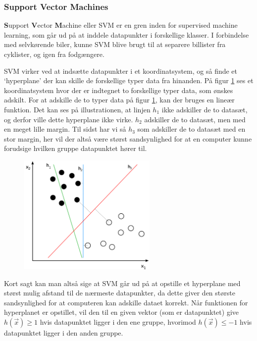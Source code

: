 \subsubsection{Support Vector Machines}
\textbf{S}upport \textbf{V}ector \textbf{M}achine eller SVM er en gren inden for supervised machine learning\cite{ML_BOOK}, som går ud på at inddele datapunkter i forskellige klasser. I forbindelse med selvkørende biler, kunne SVM blive brugt til at separere billister fra cyklister, og igen fra fodgængere.

SVM virker ved at indsætte datapunkter i et koordinatsystem, og så finde et `hyperplane' der kan skille de forskellige typer data fra hinanden. På figur \ref{fig:SVM} ses et koordinatsystem hvor der er indtegnet to forskellige typer data, som ønskes adskilt. For at adskille de to typer data på figur \ref{fig:SVM}, kan der bruges en lineær funktion. Det kan ses på illustrationen, at linjen $h_1$ ikke adskiller de to datasæt, og derfor ville dette hyperplane ikke virke. $h_2$ adskiller de to datasæt, men med en meget lille margin. Til sidst har vi så $h_3$ som adskiller de to datasæt med en stor margin, her vil der altså være størst sandsynlighed for at en computer kunne forudsige hvilken gruppe datapunktet hører til. 
\begin{figure}[h!]
	\centering
	\includegraphics[width=0.6\textwidth]{images/SVM.png}
	\label{fig:SVM}
\end{figure}

Kort sagt kan man altså sige at SVM går ud på at opstille et hyperplane med størst mulig afstand til de nærmeste datapunkter, da dette giver den største sandsynlighed for at computeren kan adskille dataet korrekt.
Når funktionen for hyperplanet er opstillet, vil den til en given vektor (som er datapunktet) give $h(\vec{x}) \geq 1$ hvis datapunktet ligger i den ene gruppe, hvorimod $h(\vec{x}) \leq -1$ hvis datapunktet ligger i den anden gruppe. 